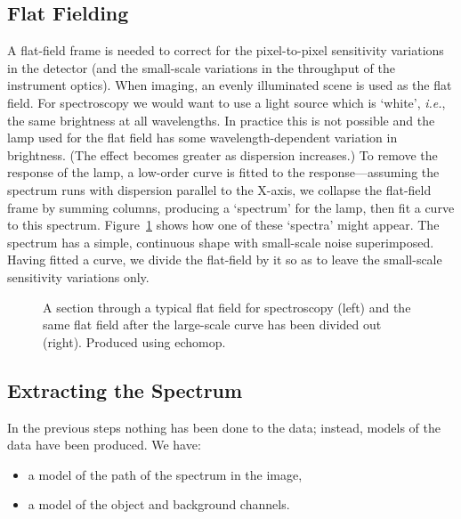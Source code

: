\documentclass[twoside,11pt]{article}
\newcommand{\htmlref}[2]{#1}
\newcommand{\xref}[3]{#1}
\newcommand{\xlabel}[1]{}
\newcommand{\mlabel}[1]{\xlabel{#1}\label{#1}}
\newcommand{\scspec}[2]{#1}
\newcommand{\scspec}[2]{#2}
\begin{document}
\subsection{\mlabel{flat_fielding}Flat Fielding}

A \htmlref{flat-field}{gl_flat_field} frame is needed to correct for the
pixel-to-pixel sensitivity variations in the detector (and the small-scale
variations in the throughput of the instrument optics).
When imaging, an evenly illuminated scene is used as the flat field.
For spectroscopy we would want to use a light source
which is `white', {\it{i.e.}}, the same brightness at all wavelengths.
In practice this is not possible and the lamp used for the flat
field has some wavelength-dependent variation in brightness.  (The effect
becomes greater as dispersion increases.)  To remove the response
of the lamp, a low-order curve is fitted to the
response\scspec{---}{ - }assuming the spectrum runs with dispersion parallel
to the X-axis, we collapse the flat-field frame by summing columns, producing
a `spectrum' for the lamp, then fit a curve to this spectrum.
\scspec{Figure~\ref{fi_flat_field}}{The figure below}
shows how one of these `spectra' might appear.
The spectrum has a simple, continuous shape with small-scale noise
superimposed.
Having fitted a curve, we divide the flat-field by it so as to leave
the small-scale sensitivity variations only.

\begin{figure}
\begin{center}
  \scspec{\leavevmode\epsfysize=55mm\epsfbox{sc7_06.eps}}
         {\leavevmode\epsfysize=66mm}

  \parbox{140mm}{
    \caption{A section through a typical flat field for spectroscopy
             (left) and the same flat field after the large-scale
	     curve has been divided out (right).  Produced using
	     \xref{{\sc echomop}}{sun152}{}.}
    \label{fi_flat_field}
  }
\end{center}
\end{figure}


\subsection{\mlabel{extraction}Extracting the Spectrum}

In the previous steps nothing has been done to the data;
instead, models of the data have been produced.  We have:

\begin{itemize}

\item a model of the path of the spectrum in the image,

\item a model of the object and background channels.

\end{itemize}
\end{document}
